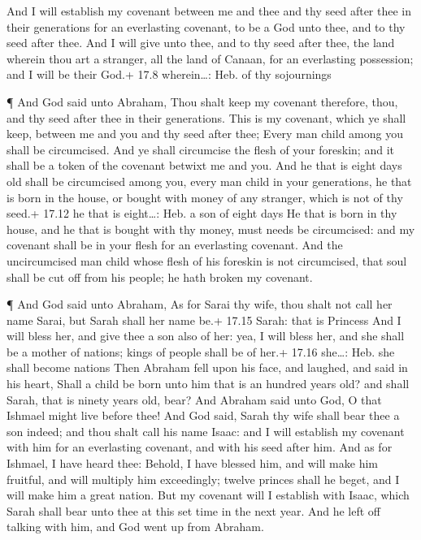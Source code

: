  And I will establish my covenant between me and thee and
thy seed after thee in their generations for an everlasting covenant, to
be a God unto thee, and to thy seed after thee.  And I will
give unto thee, and to thy seed after thee, the land wherein thou art a
stranger, all the land of Canaan, for an everlasting possession; and I
will be their God.+ 17.8 wherein\ldots: Heb. of thy sojournings

 ¶ And God said unto Abraham, Thou shalt keep my covenant
therefore, thou, and thy seed after thee in their generations.
 This is my covenant, which ye shall keep, between me and
you and thy seed after thee; Every man child among you shall be
circumcised.  And ye shall circumcise the flesh of your
foreskin; and it shall be a token of the covenant betwixt me and you.
 And he that is eight days old shall be circumcised among
you, every man child in your generations, he that is born in the house,
or bought with money of any stranger, which is not of thy seed.+ 17.12
he that is eight\ldots: Heb. a son of eight days  He that
is born in thy house, and he that is bought with thy money, must needs
be circumcised: and my covenant shall be in your flesh for an
everlasting covenant.  And the uncircumcised man child
whose flesh of his foreskin is not circumcised, that soul shall be cut
off from his people; he hath broken my covenant.

 ¶ And God said unto Abraham, As for Sarai thy wife, thou
shalt not call her name Sarai, but Sarah shall her name be.+ 17.15
Sarah: that is Princess  And I will bless her, and give
thee a son also of her: yea, I will bless her, and she shall be a mother
of nations; kings of people shall be of her.+ 17.16 she\ldots: Heb. she
shall become nations  Then Abraham fell upon his face, and
laughed, and said in his heart, Shall a child be born unto him that is
an hundred years old? and shall Sarah, that is ninety years old, bear?
 And Abraham said unto God, O that Ishmael might live
before thee!  And God said, Sarah thy wife shall bear thee
a son indeed; and thou shalt call his name Isaac: and I will establish
my covenant with him for an everlasting covenant, and with his seed
after him.  And as for Ishmael, I have heard thee: Behold,
I have blessed him, and will make him fruitful, and will multiply him
exceedingly; twelve princes shall he beget, and I will make him a great
nation.  But my covenant will I establish with Isaac, which
Sarah shall bear unto thee at this set time in the next year.
 And he left off talking with him, and God went up from
Abraham.

